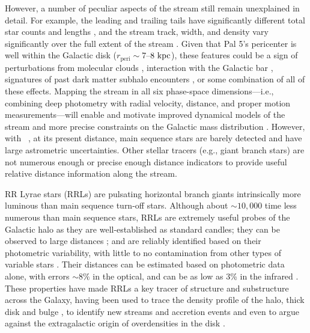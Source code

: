 \documentclass[twocolumn]{aastex63}
\begin{document}
However, a number of peculiar aspects of the stream still remain unexplained in detail.
For example, the leading and trailing tails have significantly different total star counts and lengths \citep[both different by a factor of $\sim$2 between leading and trailing;][]{Dehnen:2004, Bernard:2016}, and the stream track, width, and density vary significantly over the full extent of the stream \citep{Ibata:2016, Bonaca:2019}.
Given that Pal 5's pericenter is well within the Galactic disk ($r_{\textrm{peri}} \sim 7$--$8~\mathrm{kpc}$),
these features could be a sign of perturbations from molecular clouds \citep[e.g.,][]{Amorisco:2016}, interaction with the Galactic bar \citep[e.g.,][]{Pearson:2017}, signatures of past dark matter subhalo encounters \citep[e.g.,][]{Erkal:2017}, or some combination of all of these effects.
Mapping the stream in all six phase-space dimensions---i.e., combining deep photometry with radial velocity, distance, and proper motion measurements---will enable and motivate improved dynamical models of the stream and more precise constraints on the Galactic mass distribution \citep[e.g.,][]{PriceWhelan:2013}.
However, with \Gaia\ , at its present distance, main sequence stars are barely detected and have large astrometric uncertainties.
Other stellar tracers (e.g., giant branch stars) are not numerous enough or precise enough distance indicators to provide useful relative distance information along the stream.

RR Lyrae stars (RRLs) are pulsating horizontal branch giants intrinsically more luminous than main sequence turn-off stars. Although about $\sim 10,000$ time less numerous than main sequence stars, RRLs are extremely useful probes of the Galactic halo as they are well-established as standard candles; they can be observed to large distances \citep{Medina:2018,Sesar:2017c}; and are reliably identified based on their photometric variability, with little to no contamination from other types of variable stars \citep[e.g.,][]{Holl:2018,Drake:2017,Mateu:2012}. Their distances can be estimated based on photometric data alone, with errors $\sim8\%$ in the optical, and can be as low as 3\% in the infrared \citep{Neeley:2017}. These properties have made RRLs a key tracer of structure and substructure across the Galaxy, having been used to trace the density profile of the halo, thick disk and bulge \citep[e.g.,][and reference therein]{Iorio:2018,Mateu:2018b,Kunder:2008}, to identify new streams and accretion events \citep[e.g.]{Duffau:2006,Sesar:2010,Mateu:2018,Iorio:2019} and even to argue against the extragalactic origin of overdensities in the disk \citep{Mateu:2009, Price-Whelan:2015}.
\end{document}
